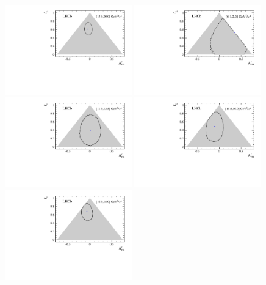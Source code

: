 \begin{figure}[h]
\centering
\includegraphics[width=0.49\textwidth]{Lmumu/figs/paper/figure9.pdf}
\includegraphics[width=0.49\textwidth]{Lmumu/figs/paper/figure10a.pdf}
\includegraphics[width=0.49\textwidth]{Lmumu/figs/paper/figure10b.pdf}
\includegraphics[width=0.49\textwidth]{Lmumu/figs/paper/figure10c.pdf}
\includegraphics[width=0.49\textwidth]{Lmumu/figs/paper/figure10d.pdf}

\end{figure}
